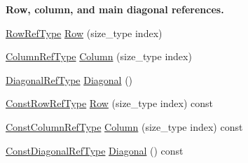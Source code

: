 \begin{Indent}{\bf Row, column, and main diagonal references.}\par
\begin{DoxyCompactItemize}
\item 
\hyperlink{classvct_fixed_size_const_matrix_base_a2ce1bc7d955f66d28462cb34b62d69b7}{Row\+Ref\+Type} \hyperlink{classvct_fixed_size_matrix_base_a8963e27f4adc44551ce264411e80f554}{Row} (size\+\_\+type index)
\item 
\hyperlink{classvct_fixed_size_const_matrix_base_a9cbbc3a040a90709bdeac3b94c766131}{Column\+Ref\+Type} \hyperlink{classvct_fixed_size_matrix_base_a5744915514d3e68fa98895533738f474}{Column} (size\+\_\+type index)
\item 
\hyperlink{classvct_fixed_size_const_matrix_base_ae0b335e845233b49e01f24c1518ee6a1}{Diagonal\+Ref\+Type} \hyperlink{classvct_fixed_size_matrix_base_a77d3d0de82be6ee1c4512a2039792af5}{Diagonal} ()
\item 
\hyperlink{classvct_fixed_size_const_matrix_base_a74355396eec7437755398c2810e0df41}{Const\+Row\+Ref\+Type} \hyperlink{classvct_fixed_size_matrix_base_abf4ba06a3c1d8e064a595e9a29685793}{Row} (size\+\_\+type index) const 
\item 
\hyperlink{classvct_fixed_size_const_matrix_base_a68ed47f84a2855832fa0c18fafda6843}{Const\+Column\+Ref\+Type} \hyperlink{classvct_fixed_size_matrix_base_a4e86ebded9a4b98c29c597f8e1529e53}{Column} (size\+\_\+type index) const 
\item 
\hyperlink{classvct_fixed_size_const_matrix_base_a54699d7dbe28072365fab4aa99c68d66}{Const\+Diagonal\+Ref\+Type} \hyperlink{classvct_fixed_size_matrix_base_a7e1258bbfc0a349a226ebccbe159274c}{Diagonal} () const 
\end{DoxyCompactItemize}
\end{Indent}
{\bf }\par
